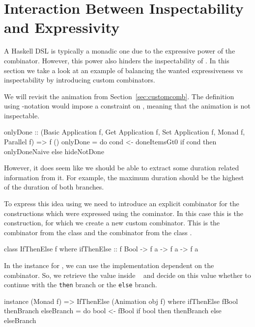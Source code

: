\section{Interaction Between Inspectability and Expressivity}
\label{sec:interaction}

A Haskell DSL is typically a monadic one due to the expressive power of the \hs{>>=} combinator. However, this power also hinders the inspectability of \dsl{}. In this section we take a look at an example of balancing the wanted expressiveness vs inspectability by introducing custom combinators.

We will revisit the  animation from Section~\ref{sec:customcomb}. The definition using -notation would impose a  constraint on , meaning that the animation is not inspectable.

\begin{spec}
onlyDone :: (Basic Application f, Get Application f,
  Set Application f, Monad f, Parallel f) => f ()
onlyDone = do
  cond <- doneItemsGt0
  if cond then onlyDoneNaive else hideNotDone
\end{spec}

However, it does seem like we should be able to extract some duration related information from it. For example, the maximum duration should be the highest of the duration of both branches.

To express this idea using \dsl{} we need to introduce an explicit combinator for the constructions which were expressed using the \hs{>>=} cominator. In this case this is the  construction, for which we create a new custom combinator. This is the  combinator from the  class \cite{DBLP:phd/ethos/Yallop10} and the  combinator from the  class \cite{Mokhov:2019:SAF:3352468.3341694}.

\begin{code}
class IfThenElse f where
  ifThenElse :: f Bool -> f a -> f a -> f a
\end{code}

In the instance for , we can use the implementation dependent on the \hs{>>=} combinator. So, we retrieve the value inside ~ and decide on this value whether to continue with the \texttt{then} branch or the \texttt{else} branch.

\begin{code}
instance (Monad f) => IfThenElse (Animation obj f) where
  ifThenElse fBool thenBranch elseBranch = do
    bool <- fBool
    if bool then thenBranch else elseBranch
\end{code}

